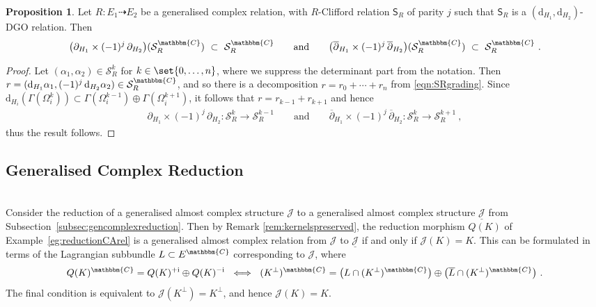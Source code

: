 \documentclass[a4paper, reqno, 11pt]{amsart}
\numberwithin{equation}{section}
\theoremstyle{definition}
\newtheorem{proposition}[equation]{Proposition}
\newcommand{\red}[1]{\underline{#1}}
\newcommand{\de}{\mathrm{d}}
\newcommand{\ii}{\mathrm{i}}
\newcommand{\IC}{\mathbbm{C}}
\newcommand{\cS}{{\mathcal S}}
\newcommand{\cJ}{{\mathcal J}}
\newcommand{\sfS}{{\mathsf{S}}}
\newcommand{\sfGamma}{{\mathsf{\Gamma}}}
\newcommand{\rel}{\dashrightarrow}
\theoremstyle{remark}
\begin{document}
\begin{proposition}\label{prop:gradingforGCR}
    Let $R \colon E_1 \rel E_2$ be a generalised complex relation, with $R$-Clifford relation $\sfS_R$ of parity $j$ such that $\sfS_R$ is a $(\de_{H_1}, \de_{H_2})$-DGO relation. Then
    \begin{align}
        \big(\partial_{H_1}\times (-1)^j\, \partial_{H_2}\big)(\cS^\IC_R) \ \subset \ \cS^\IC_R  \qquad \text{and} \qquad \big(\overline{\partial}_{H_1}\times (-1)^j\, \overline \partial_{H_2}\big)(\cS^\IC_R) \ \subset \ \cS^\IC_R \ .
    \end{align}
\end{proposition}

\begin{proof}
    Let $(\alpha_1, \alpha_2) \in \cS_R^k$ for $k\in\set{0,\dots,n}$, where we suppress the determinant part from the notation. Then $r = (\de_{H_1} \alpha_1, (-1)^j\,\de_{H_2} \alpha_2) \in \cS^\IC_R$, and so there is a decomposition $r = r_0 + \cdots + r_n$ from \eqref{eqn:SRgrading}. Since  $\de_{H_i}(\sfGamma(\Omega_i^k)) \subset \sfGamma(\Omega_i^{k-1}) \oplus \sfGamma(\Omega_i^{k+1})$, it follows that $r = r_{k-1} + r_{k+1}$ and hence
    \begin{align}
        \partial_{H_1}\times (-1)^j\, \partial_{H_2} \colon \cS^k_R \longrightarrow \cS^{k-1}_R \qquad \text{and} \qquad \overline \partial_{H_1} \times (-1)^j\, \overline \partial_{H_2} \colon \cS^k_R \longrightarrow \cS^{k+1}_R \ ,
    \end{align}
    thus the result follows.
\end{proof}

\medskip

\subsection{Generalised Complex Reduction}~\\[5pt]
    Consider the reduction of a generalised almost complex structure $\cJ$ to a generalised almost complex structure $\red \cJ$ from Subsection~\ref{subsec:gencomplexreduction}.
    Then by Remark \ref{rem:kernelspreserved}, the reduction morphism $Q(K)$ of Example~\ref{eg:reductionCArel} is a generalised almost complex relation from $\cJ$ to $\red \cJ$ if and only if $\cJ(K) = K$. This can be formulated in terms of the Lagrangian subbundle $L\subset E^\IC$ corresponding to $\cJ$, where 
    \begin{align}
        Q(K)^\IC = Q(K)^{+\ii} \oplus Q(K)^{-\ii} \ \iff \ (K^\perp)^\IC = \big(L\cap (K^\perp)^\IC\big) \oplus \big(\overline{L}\cap (K^\perp)^\IC\big) \ .
    \end{align}
    The final condition is equivalent to $\cJ(K^\perp) = K^\perp$, and hence $\cJ(K)=K$.
\end{document}
